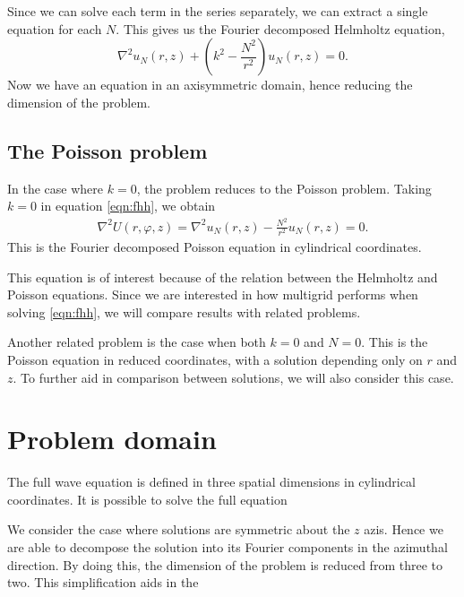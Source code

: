 Since we can solve each term in the series separately, we can extract a single equation for each $N$.
This gives us the Fourier decomposed Helmholtz equation,
\begin{equation}
	\nabla^2 u_N(r,z) + (k^2 - \frac{N^2}{r^2})u_N(r,z) = 0. \label{eqn:fhh}
\end{equation}
Now we have an equation in an axisymmetric domain, hence reducing the dimension of the problem.



\subsection{The Poisson problem}

In the case where $k=0$, the problem reduces to the Poisson problem.
Taking $k=0$ in equation \eqref{eqn:fhh}, we obtain
\begin{align}
	\nabla^2 U(r,\varphi,z) = \nabla^2 u_N(r,z) - \frac{N^2}{r^2} u_N(r,z) = 0. \label{eqn:fp}
\end{align}
This is the Fourier decomposed Poisson equation in cylindrical coordinates.

This equation is of interest because of the relation between the Helmholtz and Poisson equations.
Since we are interested in how multigrid performs when solving \eqref{eqn:fhh}, we will compare results with related problems.

Another related problem is the case when both $k=0$ and $N=0$.
This is the Poisson equation in reduced coordinates, with a solution depending only on $r$ and $z$.
To further aid in comparison between solutions, we will also consider this case.







\section{Problem domain}

The full wave equation is defined in three spatial dimensions in cylindrical coordinates.
It is possible to solve the full equation

We consider the case where solutions are symmetric about the $z$ azis.
Hence we are able to decompose the solution into its Fourier components in the azimuthal direction.
By doing this, the dimension of the problem is reduced from three to two.
This simplification aids in the 

